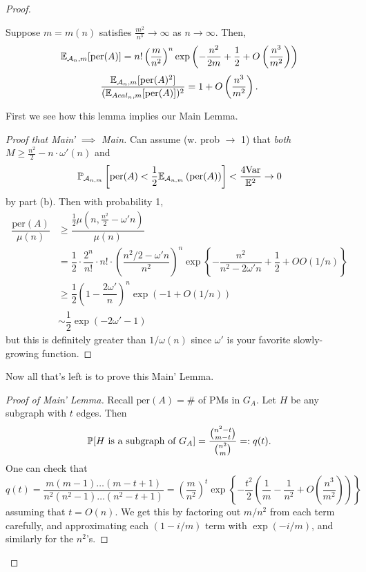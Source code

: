 \documentclass[11 pt]{scrartcl}
\newcommand{\per}{\text{per}}
\begin{document}
\begin{proof}
        \begin{lemma}
            Suppose $m = m(n)$ satisfies $\frac{m^2}{n^3}\to \infty$ as $n\to \infty$. Then, 
            \alphanum
            \ii \[\EE_{\Acal_n, m}[\per(A)] = n!\left(\frac{m}{n^2}\right)^n \exp\left(-\frac{n^2}{2m} + \frac 12 + O\left(\frac{n^3}{m^2}\right)\right)\] 
            \ii \[ \dfrac{\EE_{\Acal_n, m}[\per(A)^2]}{(\EE_{Acal_n, m}[\per(A)])^2} = 1 + O\left(\frac{n^3}{m^2}\right).\]
            \enumend
        \end{lemma}
        First we see how this lemma implies our Main Lemma. 
        \begin{proof}[Proof that Main' $\implies$ Main]
            Can assume (w. prob $\to$ 1) that \emph{both} $M\geq \frac{n^2}{2} - n\cdot \omega'(n)$ and 
            \[ \PP_{\Acal_{n,m}}\left[\per(A)< \frac 12 \EE_{\Acal_{n,m}}\left(\per(A)\right)\right] < \dfrac{4\Var}{\EE^2} \to 0\]
            by part (b). Then with probability 1, 
        \begin{align*}
            \dfrac{\per(A)}{\mu(n)} &\geq \dfrac{\frac 12 \mu(n, \frac{n^2}{2}-\omega' n)}{\mu(n)} \\
                                    &= \dfrac{1}{2}\cdot \dfrac{2^n}{n!} \cdot n! \cdot \left(\dfrac{n^2/2 - \omega' n}{n^2}\right)^n \exp\left\{ -\dfrac{n^2}{n^2-2\omega' n} + \dfrac{1}{2} + OO(1/n)\right\} \\ 
                                    &\geq \dfrac{1}{2} \left(1-\dfrac{2\omega'}{n}\right)^n \exp(-1 + O(1/n)) \\ 
                                    &\sim \dfrac{1}{2} \exp(-2\omega' -1)
        \end{align*}
        but this is definitely greater than $1/\omega(n)$ since $\omega'$ is your favorite slowly-growing function. 
        \end{proof}
    Now all that's left is to prove this Main' Lemma. 
    \begin{proof}[Proof of Main' Lemma]
        Recall $\per(A) = \#$ of PMs in $G_A$. Let $H$ be any subgraph with $t$ edges. Then 
        \[ \mathbb P[H\text{ is a subgraph of }G_A] = \dfrac{\binom{n^2-t}{m-t}}{\binom{n^2}{m}} =: q(t).\] 
        One can check that 
        \[ q(t) = \dfrac{m(m-1)\dots (m-t+1)}{n^2(n^2-1)\dots (n^2-t+1)} = \left(\dfrac{m}{n^2}\right)^t \exp \left\{-\frac{t^2}{2} \left(\frac{1}{m} - \frac{1}{n^2} + O(\frac{n^3}{m^2})\right)\right\}\] 
        assuming that $t = O(n)$. We get this by factoring out $m/n^2$ from each term carefully, and approximating each $(1-i/m)$ term with $\exp(-i/m)$, and similarly for the $n^2$'s. 


\end{proof}
\end{proof}
\end{document}
